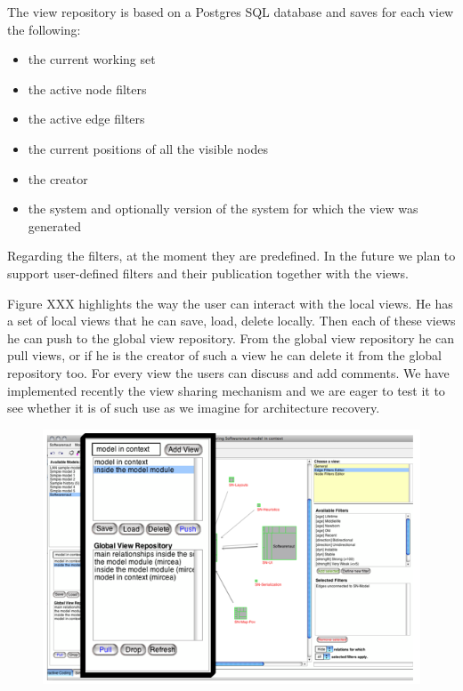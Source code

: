 \documentclass[preprint,12pt]{elsarticle}
\begin{document}
The view repository is based on a Postgres SQL database and saves for each view the following:
\begin{itemize}
\item the current working set
\item the active node filters
\item the active edge filters
\item the current positions of all the visible nodes
\item the creator
\item the system and optionally version of the system for which the view was generated
\end{itemize}

Regarding the filters, at the moment they are predefined. In the future we plan to support user-defined filters and their publication together with the views. 

Figure XXX highlights the way the user can interact with the local views. He has a set of local views that he can save, load, delete locally. Then each of these views he can push to the global view repository. From the global view repository he can pull views, or if he is the creator of such a view he can delete it from the global repository too. For every view the users can discuss and add comments. We have implemented recently the view sharing mechanism and we are eager to test it to see whether it is of such use as we imagine for architecture recovery. 

\begin{figure}[h]
\begin{center}
\includegraphics[width=\linewidth]{images/ViewOperations.png}
\caption{}
\label{}
\end{center}
\end{figure}
\end{document}
